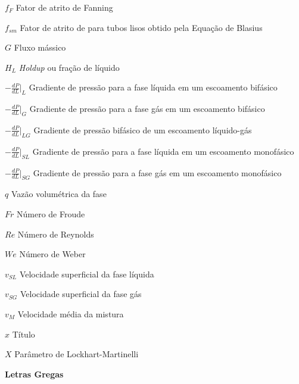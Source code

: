 \begin{simbolos}
   \item[$f_F$] Fator de atrito de Fanning \space [-]
   \item[$f_{sm}$] Fator de atrito de para tubos lisos obtido pela Equação de Blasius \space [-]
   \item[$G$] Fluxo mássico \space [$kg/m^2s$]
   \item[$H_L$] \textit{Holdup} ou fração de líquido \space [-]
   \item[$-\frac{dP}{dL}\bigg|_L$] Gradiente de pressão para a fase líquida em um escoamento bifásico \space [$Pa/m$]
   \item[$-\frac{dP}{dL}\bigg|_G$] Gradiente de pressão para a fase gás em um escoamento bifásico \space [$Pa/m$]
   \item[$-\frac{dP}{dL}\bigg|_{LG}$] Gradiente de pressão bifásico de um escoamento líquido-gás \space [$Pa/m$]
   \item[$-\frac{dP}{dL}\bigg|_{SL}$] Gradiente de pressão para a fase líquida em um escoamento monofásico \space [$Pa/m$]
   \item[$-\frac{dP}{dL}\bigg|_{SG}$] Gradiente de pressão para a fase gás em um escoamento monofásico \space [$Pa/m$]
   \item[$q$] Vazão volumétrica da fase \space [$m^3/s$]
   \item[$ Fr $] Número de Froude \space [-]
   \item[$ Re $] Número de Reynolds \space [-]
   \item[$ We $] Número de Weber \space [-]
   \item[$v_{SL}$] Velocidade superficial da fase líquida \space [$m/s$]
   \item[$v_{SG}$] Velocidade superficial da fase gás \space [$m/s$]
   \item[$v_M$] Velocidade média da mistura \space [$m/s$]
   \item[$x$] Título \space [-]
   \item[$ X $] Parâmetro de Lockhart-Martinelli \space [-]
   
   \item[\textbf{Letras Gregas}]
   

\end{simbolos}
